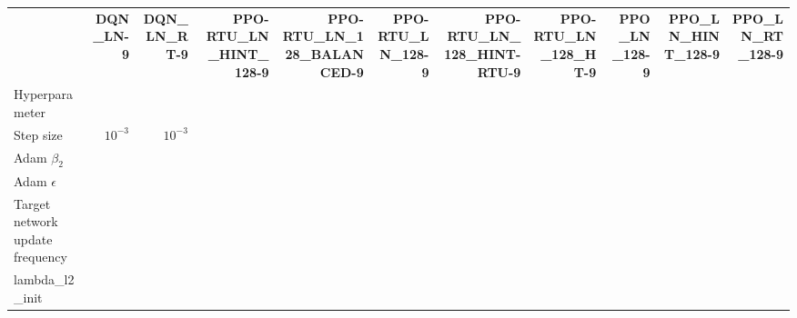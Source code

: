 \begin{tabular}{lrrrrrrrrrr}
 & \bfseries DQN_LN-9 & \bfseries DQN_LN_RT-9 & \bfseries PPO-RTU_LN_HINT_128-9 & \bfseries PPO-RTU_LN_128_BALANCED-9 & \bfseries PPO-RTU_LN_128-9 & \bfseries PPO-RTU_LN_128_HINT-RTU-9 & \bfseries PPO-RTU_LN_128_HT-9 & \bfseries PPO_LN_128-9 & \bfseries PPO_LN_HINT_128-9 & \bfseries PPO_LN_RT_128-9 \\
Hyperparameter &  &  &  &  &  &  &  &  &  &  \\
Step size & $10^{-3}$ & $10^{-3}$ &  &  &  &  &  &  &  &  \\
Adam $\beta_2$ &  &  &  &  &  &  &  &  &  &  \\
Adam $\epsilon$ &  &  &  &  &  &  &  &  &  &  \\
Target network update frequency &  &  &  &  &  &  &  &  &  &  \\
lambda_l2_init &  &  &  &  &  &  &  &  &  &  \\
\end{tabular}
